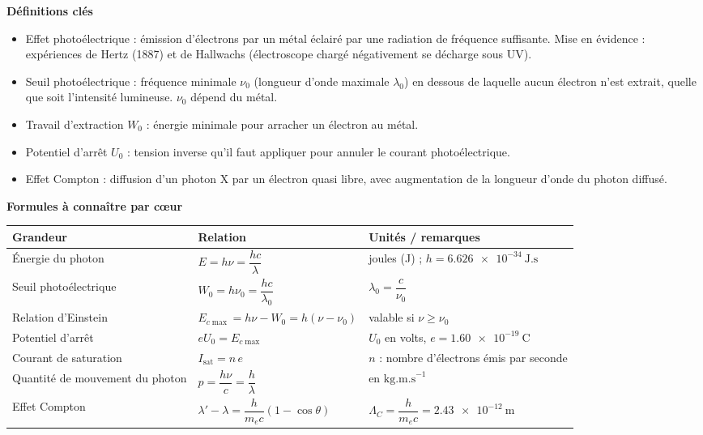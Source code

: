 \documentclass[11pt]{article}
\newcommand{\cle}[1]{{\popxbold\color{popdark}#1}}
\begin{document}
\begin{bilan}
\textbf{Définitions clés}
\begin{itemize}
  \item \cle{Effet photoélectrique} : émission d'électrons par un métal éclairé par une radiation de fréquence suffisante. Mise en évidence : expériences de \cle{Hertz} (1887) et de \cle{Hallwachs} (électroscope chargé négativement se décharge sous UV).
  \item \cle{Seuil photoélectrique} : fréquence minimale $\nu_0$ (longueur d'onde maximale $\lambda_0$) en dessous de laquelle aucun électron n'est extrait, quelle que soit l'intensité lumineuse. $\nu_0$ dépend du métal.
  \item \cle{Travail d'extraction} $W_0$ : énergie minimale pour arracher un électron au métal.
  \item \cle{Potentiel d'arrêt} $U_0$ : tension inverse qu'il faut appliquer pour annuler le courant photoélectrique.
  \item \cle{Effet Compton} : diffusion d'un photon X par un électron quasi libre, avec augmentation de la longueur d'onde du photon diffusé.
\end{itemize}

\textbf{Formules à connaître par cœur}
\begin{center}
\begin{tabularx}{\linewidth}{|l|X|l|}
\hline
\rowcolor{popblueL} \textbf{Grandeur} & \textbf{Relation} & \textbf{Unités / remarques} \\
\hline
Énergie du photon & $E = h\nu = \dfrac{hc}{\lambda}$ & joules (J) ; $h = \num{6,626e-34}\ \text{J.s}$ \\
\hline
Seuil photoélectrique & $W_0 = h\nu_0 = \dfrac{hc}{\lambda_0}$ & $\lambda_0 = \dfrac{c}{\nu_0}$ \\
\hline
Relation d'Einstein & $E_{c\max} = h\nu - W_0 = h(\nu - \nu_0)$ & valable si $\nu \geq \nu_0$ \\
\hline
Potentiel d'arrêt & $eU_0 = E_{c\max}$ & $U_0$ en volts, $e = \num{1,60e-19}\ \text{C}$ \\
\hline
Courant de saturation & $I_{\text{sat}} = n\,e$ & $n$ : nombre d'électrons émis par seconde \\
\hline
Quantité de mouvement du photon & $p = \dfrac{h\nu}{c} = \dfrac{h}{\lambda}$ & en $\text{kg.m.s}^{-1}$ \\
\hline
Effet Compton & $\lambda' - \lambda = \dfrac{h}{m_e c}(1 - \cos\theta)$ & $\Lambda_C = \dfrac{h}{m_e c} = \num{2,43e-12}\ \text{m}$ \\
\hline
\end{tabularx}
\end{center}


\end{bilan}
\end{document}
